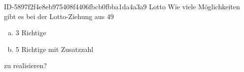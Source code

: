 \begin{exercise}
      {ID-5897f2f4e8eb975408f4406fbcb0fbba1da4a3a9}
      {Lotto}
  \ifproblem\problem
    Wie viele Möglichkeiten gibt es bei der Lotto-Ziehung  aus 49\grqq{}
    \begin{enumerate}[a)]
      \item 3 Richtige
      \item 5 Richtige mit Zusatzzahl
    \end{enumerate}
    zu realisieren?
  \fi
\end{exercise}
